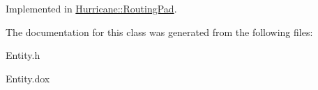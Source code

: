 Implemented in \hyperlink{classHurricane_1_1RoutingPad_a2cc2894b5e1c82b725dedcf1978dc773}{Hurricane\+::\+Routing\+Pad}.



The documentation for this class was generated from the following files\+:\begin{DoxyCompactItemize}
\item 
Entity.\+h\item 
Entity.\+dox\end{DoxyCompactItemize}

